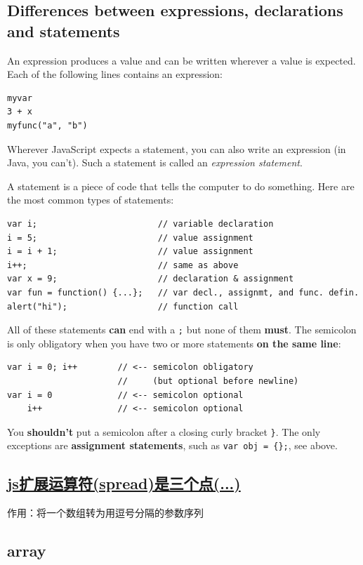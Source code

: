 \documentclass[a4paper, 12pt]{article}
\begin{document}
\subsection{Differences between expressions, declarations and statements}
An expression produces a value and can be written wherever a value is expected. Each of the following lines contains an expression:
\begin{verbatim}
myvar
3 + x
myfunc("a", "b")
\end{verbatim}

Wherever JavaScript expects a statement, you can also write an expression (in Java, you can't). Such a statement is called an \textit{expression statement}.

A statement is a piece of code that tells the computer to do something. Here are the most common types of statements:
\begin{verbatim}
var i;                        // variable declaration
i = 5;                        // value assignment
i = i + 1;                    // value assignment
i++;                          // same as above
var x = 9;                    // declaration & assignment
var fun = function() {...};   // var decl., assignmt, and func. defin.
alert("hi");                  // function call
\end{verbatim}
All of these statements \textbf{can} end with a \verb|;| but none of them \textbf{must}. The semicolon is only obligatory when you have two or more statements \textbf{on the same line}:
\begin{verbatim}
var i = 0; i++        // <-- semicolon obligatory
                      //     (but optional before newline)
var i = 0             // <-- semicolon optional
    i++               // <-- semicolon optional
\end{verbatim}
You \textbf{shouldn't} put a semicolon after a closing curly bracket \verb|}|. The only exceptions are \textbf{assignment statements}, such as \verb|var obj = {};|, see above.


\subsection{\href{https://www.cnblogs.com/wangyunhui/p/7511615.html}{js扩展运算符(spread)是三个点(...)}}
作用：将一个数组转为用逗号分隔的参数序列

\subsection{array}
\end{document}
